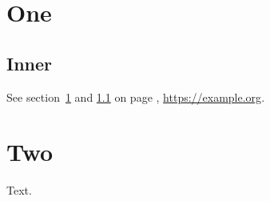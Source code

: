 \documentclass{article}
\begin{document}
\section{One}\label{one}
\subsection{Inner}\label{inner}
See section~\ref{one} and \ref{inner} on page \pageref{inner}, \url{https://example.org}.
\section{Two}
Text.
\end{document}
